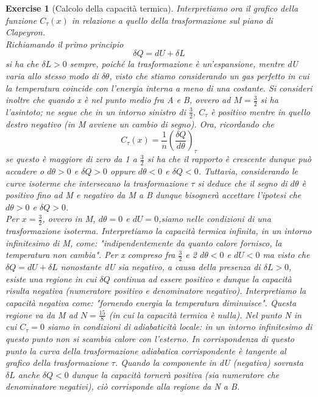 \documentclass[10pt,a4paper]{article}
\newtheorem{exercise}{Exercise}
\begin{document}
\begin{exercise}[Calcolo della capacità termica]
Interpretiamo ora il grafico della funzione $C_{\tau}(x)$ in relazione a quello della trasformazione sul piano di Clapeyron.\\

Richiamando il primo principio \[\delta Q = dU + \delta L\] si ha che $\delta L > 0$ sempre, poiché la trasformazione è un'espansione, mentre dU varia allo stesso modo di $\delta\theta$, visto che stiamo considerando un gas perfetto in cui la temperatura coincide con l'energia interna a meno di una costante.
Si consideri inoltre che quando x è nel punto medio fra A e B, ovvero ad \(M=\frac{3}{2}\) si ha l'asintoto; ne segue che in un intorno sinistro di $\frac{3}{2}$, $C_{\tau}$ è positivo mentre in quello destro negativo (in M avviene un cambio di segno). Ora, ricordando che \[C_{\tau}(x) = \frac{1}{n}\left(\frac{\delta Q}{d\theta}\right)_{\tau}\] se questo è maggiore di zero da 1 a $\frac{3}{2}$ si ha che il rapporto è crescente dunque può accadere o \(d\theta > 0\) e \(\delta Q > 0\) oppure \(d\theta < 0\) e \(\delta Q < 0\). Tuttavia, considerando le curve isoterme che intersecano la trasformazione $\tau$ si deduce che il segno di $d\theta$ è positivo fino ad M e negativo da M a B dunque bisognerà accettare l'ipotesi che \(d\theta > 0\) e \(\delta Q > 0\). \\
Per \(x = \frac{3}{2}\), ovvero in M, \(d\theta = 0\) e \(dU = 0\),siamo nelle condizioni di una trasformazione isoterma. Interpretiamo la capacità termica infinita, in un intorno infinitesimo di M, come: "indipendentemente da quanto calore fornisco, la temperatura non cambia".
Per x compreso fra $\frac{3}{2}$ e 2 \(d\theta < 0\) e \(dU < 0\) ma visto che \(\delta Q = dU + \delta L\) nonostante dU sia negativo, a causa della presenza di $\delta L > 0$, esiste una regione in cui $\delta Q$ continua ad essere positivo e dunque la capacità risulta negativa (numeratore positivo e denominatore negativo). Interpretiamo la capacità negativa come: "fornendo energia la temperatura diminuisce". Questa regione va da M ad $N = \frac{15}{8}$ (in cui la capacità termica è nulla).
Nel punto N in cui $C_{\tau}=0$ siamo in condizioni di adiabaticità locale: in un intorno infinitesimo di questo punto non si scambia calore con l'esterno. In corrispondenza di questo punto la curva della trasformazione adiabatica corrispondente è tangente al grafico della trasformazione $\tau$.
Quando la componente in dU (negativa) sovrasta $\delta L$ anche $\delta Q < 0$ dunque la capacità tornerà positiva (sia numeratore che denominatore negativi), ciò corrisponde alla regione da N a B. 
\end{exercise}
\end{document}
